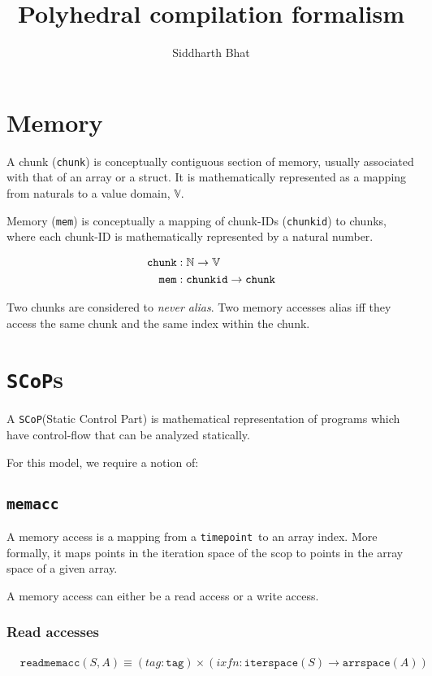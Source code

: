 \documentclass{article}
\title{Polyhedral compilation formalism}
\author{Siddharth Bhat}
\newcommand{\N}{\mathbb{N}}
\newcommand{\val}{\mathbb{V}}
\newcommand{\chunkid}{\texttt{chunkid}}
\newcommand{\chunk}{\texttt{chunk}}
\newcommand{\mem}{\texttt{mem}}
\newcommand{\scop}{\texttt{SCoP}}
\newcommand{\scops}{\scop s}
\newcommand{\memacc}{\texttt{memacc}}
\newcommand{\timepoint}{\texttt{timepoint}}
\newcommand{\iterspace}{\texttt{iterspace}}
\newcommand{\arrspace}{\texttt{arrspace}}
\newcommand{\readmemacc}{\texttt{readmemacc}}
\newcommand{\readtag}{\texttt{tag}}
\begin{document}
\maketitle
\date{}
\tableofcontents

\section{Memory}
A chunk (\chunk) is conceptually contiguous section of memory, usually associated
with that of an array or a struct. It is mathematically represented as 
a mapping from naturals to a value domain, $\val$.

Memory (\mem) is conceptually a mapping of chunk-IDs (\chunkid) to chunks, where each chunk-ID
is mathematically represented by a natural number.


\begin{align*}
    \chunk &: \N \to \val \\ 
    \mem &: \text{\chunkid} \to \chunk
\end{align*}

Two chunks are considered to \textit{never alias}. Two memory accesses alias
iff they access the same chunk and the same index within the chunk.

\section{\scops}
A \scop (Static Control Part) is mathematical representation of programs
which have control-flow that can be analyzed statically.

For this model, we require a notion of:

\subsection{\memacc}
A memory access is a mapping from a \timepoint~to an array index. More formally,
it maps points in the iteration space of the scop to points in the array space
of a given array.

A memory access can either be a read access or a write access.

\subsubsection{Read accesses}
\begin{align*}
    &\readmemacc(S, A) \equiv  (tag: \readtag) \times (ixfn: \iterspace(S) \to \arrspace(A)) \\
\end{align*}
\end{document}
